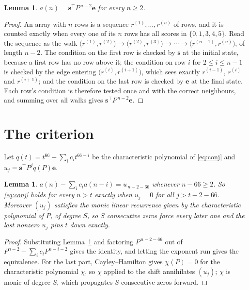 \documentclass[11pt,a4paper]{article}
\theoremstyle{plain}
\newtheorem{lemma}[theorem]{Lemma}
\theoremstyle{definition}
\begin{document}
\begin{lemma}\label{lem:walk}
$a(n)=\mathbf{s}^{\!\top}P^{\,n-2}\mathbf{e}$ for every $n\ge2$.
\end{lemma}

\begin{proof}
An array with $n$ rows is a sequence $r^{(1)},\dots,r^{(n)}$ of rows, and it is counted
exactly when every one of its $n$ rows has all scores in $\{0,1,3,4,5\}$. Read the sequence as the
walk $\bigl(r^{(1)},r^{(2)}\bigr)\to\bigl(r^{(2)},r^{(3)}\bigr)\to\cdots\to
\bigl(r^{(n-1)},r^{(n)}\bigr)$, of length $n-2$. The condition on the first row is
checked by $\mathbf{s}$ at the initial state, because a first row has no row above it; the
condition on row $i$ for $2\le i\le n-1$ is checked by the edge entering
$\bigl(r^{(i)},r^{(i+1)}\bigr)$, which sees exactly $r^{(i-1)}$, $r^{(i)}$ and
$r^{(i+1)}$; and the condition on the last row is checked by $\mathbf{e}$ at the final
state. Each row's condition is therefore tested once and with the correct neighbours, and
summing over all walks gives $\mathbf{s}^{\!\top}P^{\,n-2}\mathbf{e}$.
\end{proof}

\section{The criterion}

Let $q(t)=t^{66}-\sum_i c_i t^{66-i}$ be the characteristic polynomial of
\eqref{eq:conj} and $u_j=\mathbf{s}^{\!\top}P^{j}q(P)\mathbf{e}$.

\begin{lemma}\label{lem:crit}
$a(n)-\sum_i c_i a(n-i)=u_{\,n-2-66}$ whenever $n-66\ge2$. So \eqref{eq:conj}
holds for every $n>t$ exactly when $u_j=0$ for all $j>t-2-66$. Moreover $(u_j)$
satisfies the monic linear recurrence given by the characteristic polynomial of $P$, of
degree $S$, so $S$ consecutive zeros force every later one and the last nonzero $u_j$ pins
$t$ down exactly.
\end{lemma}

\begin{proof}
Substituting Lemma~\ref{lem:walk} and factoring $P^{\,n-2-66}$ out of
$P^{n-2}-\sum_i c_i P^{n-i-2}$ gives the identity, and letting the exponent run gives the
equivalence. For the last part, Cayley--Hamilton gives $\chi(P)=0$ for the characteristic
polynomial $\chi$, so $\chi$ applied to the shift annihilates $(u_j)$; $\chi$ is monic of
degree $S$, which propagates $S$ consecutive zeros forward.
\end{proof}
\end{document}
